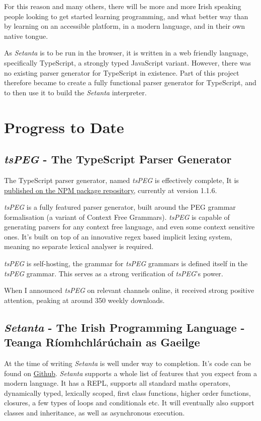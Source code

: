 \documentclass[11pt]{extarticle}
\newcommand{\Setanta}{\emph{Setanta}}
\newcommand{\tsPEG}{\emph{tsPEG}}
\begin{document}
        For this reason and many others, there will be more and more Irish speaking people looking to get started learning programming, and what better way than by learning on an accessible platform, in a modern language, and in their own native tongue.

        As \Setanta{} is to be run in the browser, it is written in a web friendly language, specifically TypeScript, a strongly typed JavaScript variant. However, there was no existing parser generator for TypeScript in existence. Part of this project therefore became to create a fully functional parser generator for TypeScript, and to then use it to build the \Setanta{} interpreter.

    \section{Progress to Date}
        \subsection{\tsPEG{} - The TypeScript Parser Generator}

            The TypeScript parser generator, named \tsPEG{} is effectively complete, It is \href{https://www.npmjs.com/package/tspeg}{published on the NPM package repository}, currently at version 1.1.6.

            \tsPEG{} is a fully featured parser generator, built around the PEG grammar formalisation (a variant of Context Free Grammars). \tsPEG{} is capable of generating parsers for any context free language, and even some context sensitive ones. It's built on top of an innovative regex based implicit lexing system, meaning no separate lexical analyser is required.

            \tsPEG{} is self-hosting, the grammar for \tsPEG{} grammars is defined itself in the \tsPEG{} grammar. This serves as a strong verification of \tsPEG{}'s power.

            When I announced \tsPEG{} on relevant channels online, it received strong positive attention, peaking at around 350 weekly downloads.

        \subsection{\Setanta{} - The Irish Programming Language - Teanga R\'iomhchl\'ar\'uchain as Gaeilge}

            At the time of writing \Setanta{} is well under way to completion. It's code can be found on \href{https://github.com/EoinDavey/Setanta}{Github}. \Setanta{} supports a whole list of features that you expect from a modern language. It has a REPL, supports all standard maths operators, dynamically typed, lexically scoped, first class functions, higher order functions, closures, a few types of loops and conditionals etc. It will eventually also support classes and inheritance, as well as asynchronous execution.
\end{document}
